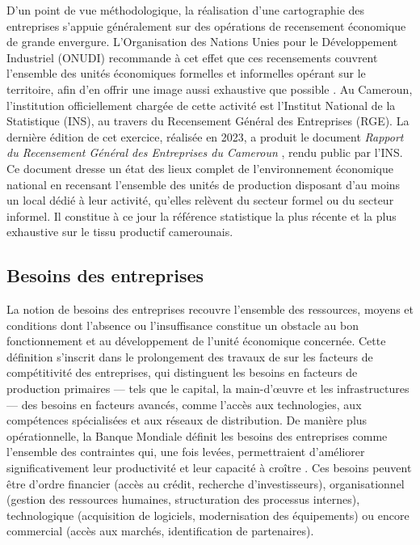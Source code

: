 \documentclass[]{article}
\begin{document}
	D'un point de vue méthodologique, la réalisation d'une cartographie des entreprises
	s'appuie généralement sur des opérations de recensement économique de grande
	envergure. L'Organisation des Nations Unies pour le Développement Industriel
	(ONUDI) recommande à cet effet que ces recensements couvrent l'ensemble des
	unités économiques formelles et informelles opérant sur le territoire, afin d'en
	offrir une image aussi exhaustive que possible \citep{unido_2022}. Au Cameroun,
	l'institution officiellement chargée de cette activité est l'Institut National de la
	Statistique (INS), au travers du Recensement Général des Entreprises (RGE). La
	dernière édition de cet exercice, réalisée en 2023, a produit le document
	\textit{Rapport du Recensement Général des Entreprises du Cameroun} \citep{ins_rge_2023},
	rendu public par l'INS. Ce document dresse un état des lieux complet de
	l'environnement économique national en recensant l'ensemble des unités de production
	disposant d'au moins un local dédié à leur activité, qu'elles relèvent du secteur
	formel ou du secteur informel. Il constitue à ce jour la référence statistique la plus
	récente et la plus exhaustive sur le tissu productif camerounais.
	
	\subsection{Besoins des entreprises}
	
	La notion de besoins des entreprises recouvre l'ensemble des ressources, moyens et
	conditions dont l'absence ou l'insuffisance constitue un obstacle au bon
	fonctionnement et au développement de l'unité économique concernée. Cette définition
	s'inscrit dans le prolongement des travaux de \citet{porter_1990} sur les facteurs de
	compétitivité des entreprises, qui distinguent les besoins en facteurs de production
	primaires --- tels que le capital, la main-d'\oe uvre et les infrastructures --- des
	besoins en facteurs avancés, comme l'accès aux technologies, aux compétences
	spécialisées et aux réseaux de distribution. De manière plus opérationnelle, la Banque
	Mondiale définit les besoins des entreprises comme l'ensemble des contraintes qui,
	une fois levées, permettraient d'améliorer significativement leur productivité et leur
	capacité à croître \citep{world_bank_doing_business_2020}. Ces besoins peuvent être
	d'ordre financier (accès au crédit, recherche d'investisseurs), organisationnel
	(gestion des ressources humaines, structuration des processus internes), technologique
	(acquisition de logiciels, modernisation des équipements) ou encore commercial
	(accès aux marchés, identification de partenaires).
	
\end{document}
